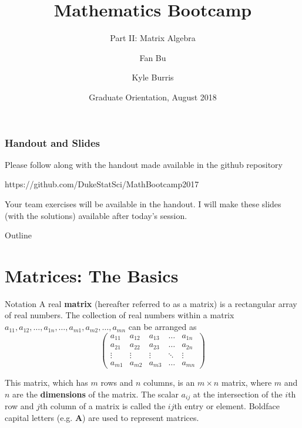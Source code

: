 \documentclass{beamer}
\title{Mathematics Bootcamp}
\subtitle{Part II: Matrix Algebra}
\author{Fan Bu \inst{1} \and Kyle Burris\inst{1}}
\institute[Duke University] %
{
  \inst{1}%
  Department of Statistical Science\\
  Duke University
  }
\date{Graduate Orientation, August 2018}
\begin{document}
\begin{frame}
  \titlepage
\end{frame}

\begin{frame}
\frametitle{Handout and Slides}

Please follow along with the handout made available in the github repository

\begin{center}
https://github.com/DukeStatSci/MathBootcamp2017
\end{center} 

Your team exercises will be available in the handout.  I will make these slides (with the solutions) available after today's session.
\end{frame}

\begin{frame}{Outline}
  \tableofcontents
\end{frame}

\section{Matrices: The Basics}
\begin{frame}{Notation}
A real \textbf{matrix} (hereafter referred to as a matrix) is a rectangular array of real numbers.  The collection of real numbers within a matrix $a_{11}, a_{12}, \hdots, a_{1n}, \hdots, a_{m1}, a_{m2}, \hdots, a_{mn}$ can be arranged as
\[
\begin{pmatrix}
    a_{11} & a_{12} & a_{13} & \dots  & a_{1n} \\
    a_{21} & a_{22} & a_{23} & \dots  & a_{2n} \\
    \vdots & \vdots & \vdots & \ddots & \vdots \\
    a_{m1} & a_{m2} & a_{m3} & \dots  & a_{mn}
\end{pmatrix}
\]

This matrix, which has $m$ rows and $n$ columns, is an $m \times n$ matrix, where $m$ and $n$ are the \textbf{dimensions} of the matrix.  The scalar $a_{ij}$ at the intersection of the $i$th row and $j$th column of a matrix is called the $ij$th entry or element.  Boldface capital letters (e.g. $\mathbf{A}$) are used to represent matrices. \\
\end{frame}
\end{document}
